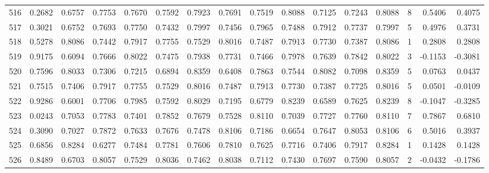 \begin{tabular}{lrrrrrrrrrrrrrrr}
516 &      0.2682 &  0.6757 &  0.7753 &  0.7670 &  0.7592 &  0.7923 &  0.7691 &  0.7519 &  0.8088 &  0.7125 &   0.7243 &     0.8088 &      8 &                    0.5406 &                     0.4075 \\
517 &      0.3021 &  0.6752 &  0.7693 &  0.7750 &  0.7432 &  0.7997 &  0.7456 &  0.7965 &  0.7488 &  0.7912 &   0.7737 &     0.7997 &      5 &                    0.4976 &                     0.3731 \\
518 &      0.5278 &  0.8086 &  0.7442 &  0.7917 &  0.7755 &  0.7529 &  0.8016 &  0.7487 &  0.7913 &  0.7730 &   0.7387 &     0.8086 &      1 &                    0.2808 &                     0.2808 \\
519 &      0.9175 &  0.6094 &  0.7666 &  0.8022 &  0.7475 &  0.7938 &  0.7731 &  0.7466 &  0.7978 &  0.7639 &   0.7842 &     0.8022 &      3 &                   -0.1153 &                    -0.3081 \\
520 &      0.7596 &  0.8033 &  0.7306 &  0.7215 &  0.6894 &  0.8359 &  0.6408 &  0.7863 &  0.7544 &  0.8082 &   0.7098 &     0.8359 &      5 &                    0.0763 &                     0.0437 \\
521 &      0.7515 &  0.7406 &  0.7917 &  0.7755 &  0.7529 &  0.8016 &  0.7487 &  0.7913 &  0.7730 &  0.7387 &   0.7725 &     0.8016 &      5 &                    0.0501 &                    -0.0109 \\
522 &      0.9286 &  0.6001 &  0.7706 &  0.7985 &  0.7592 &  0.8029 &  0.7195 &  0.6779 &  0.8239 &  0.6589 &   0.7625 &     0.8239 &      8 &                   -0.1047 &                    -0.3285 \\
523 &      0.0243 &  0.7053 &  0.7783 &  0.7401 &  0.7852 &  0.7679 &  0.7528 &  0.8110 &  0.7039 &  0.7727 &   0.7760 &     0.8110 &      7 &                    0.7867 &                     0.6810 \\
524 &      0.3090 &  0.7027 &  0.7872 &  0.7633 &  0.7676 &  0.7478 &  0.8106 &  0.7186 &  0.6654 &  0.7647 &   0.8053 &     0.8106 &      6 &                    0.5016 &                     0.3937 \\
525 &      0.6856 &  0.8284 &  0.6277 &  0.7484 &  0.7781 &  0.7606 &  0.7810 &  0.7625 &  0.7716 &  0.7406 &   0.7917 &     0.8284 &      1 &                    0.1428 &                     0.1428 \\
526 &      0.8489 &  0.6703 &  0.8057 &  0.7529 &  0.8036 &  0.7462 &  0.8038 &  0.7112 &  0.7430 &  0.7697 &   0.7590 &     0.8057 &      2 &                   -0.0432 &                    -0.1786 \\

\end{tabular}
